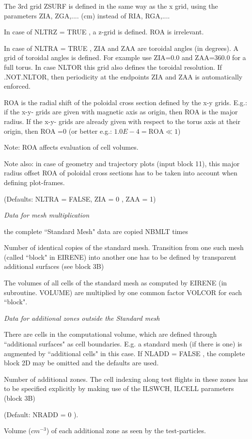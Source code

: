 \begin{list}{ }{}
The 3rd  grid ZSURF is defined in the same way as the x grid, using
the parameters ZIA, ZGA,.... (cm) instead of RIA, RGA,....

In case of NLTRZ = TRUE , a z-grid is defined. ROA is irrelevant.

In case of NLTRA = TRUE ,
ZIA and ZAA are toroidal angles (in degrees). A grid of toroidal angles
is defined. For example use ZIA=0.0 and ZAA=360.0 for a full torus.
In case NLTOR this grid also defines the toroidal resolution.
If .NOT.NLTOR, then periodicity at the endpoints ZIA and ZAA is automatically
enforced.

ROA is the radial shift of the poloidal cross section defined by the x-y grids.
E.g.: if the x-y- grids are given with magnetic axis as origin, then ROA is the major radius.
If the x-y- grids are already given with respect to the torus axis at their origin, then ROA =0 (or better e.g.: $1.0E-4 = \mbox{ROA} \ll 1$)

Note: ROA affects evaluation of cell volumes.

Note also: in case of geometry and trajectory plots (input block 11),  this major radius offset ROA of poloidal cross sections has to be taken into
account when defining plot-frames.

(Defaults: NLTRA = FALSE, ZIA = 0 , ZAA = 1)

\end{list}
{\sl Data for mesh multiplication}
\begin{list}{ }{}
\item[{\bf NLMLT }]
the complete ``Standard Mesh" data are copied NBMLT times
\item[{\bf NBMLT }]
Number of identical copies of the standard mesh. Transition from one
such mesh (called ``block" in EIRENE) into another one has to be defined
by transparent additional surfaces (see block 3B)
\item[{\bf VOLCOR }]
The volumes of all cells of the standard mesh
as computed by EIRENE (in subroutine. VOLUME) are multiplied
by one common factor VOLCOR for each ``block".
\end{list}
{\sl Data for additional zones outside the Standard mesh}
\begin{list}{ }{}
\item[{\bf NLADD }]
There are cells in the computational volume, which are defined
through ``additional surfaces" as cell boundaries.
E.g. a standard mesh (if there is one) is augmented by ``additional
cells" in this case.
If NLADD = FALSE , the complete block 2D may be omitted and
the defaults are used.
\item[{\bf NRADD }]
Number of additional zones. The  cell indexing along test
flights in these zones has to be specified explicitly by making use of
the ILSWCH, ILCELL parameters (block 3B)

(Default: NRADD = 0 ).
\item[{\bf VOLADD }]
Volume ($cm^{-3}$) of each additional zone as seen by the
test-particles.
\end{list}
